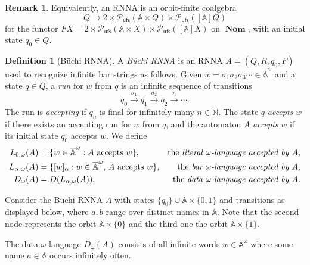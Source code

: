 \documentclass[10pt,a4paper]{amsart}
\newcommand{\midmid}{\hspace{0.2ex}{\rule[-0.1ex]{0.6pt}{1.65ex}}\hspace{0.2ex}}
\newcommand{\compr}{:}
\newcommand{\newletter}[1]{{\midmid}#1}
\newcommand{\barA}{\overline{\names}}
\numberwithin{equation}{section}
\newcommand{\xto}[1]{\xrightarrow{~#1~}}
\newcommand{\Nat}{{\mathbb{N}}}
\newcommand{\+}[1]{\mathcal{#1}\xspace}
\newcommand{\Pow}{\mathcal{P}}
\newcommand{\ufs}{{\mathsf{ufs}}}
\DeclareMathOperator{\Nom}{\mathbf{Nom}}
\newcommand{\names}{\mathbb{A}}
\theoremstyle{definition}
\newtheorem{defn}[theorem]{Definition}
\newtheorem{rem}[theorem]{Remark}
\begin{document}
%
\begin{rem}\label{rem:coalgebra}
  Equivalently, an RNNA is an orbit-finite coalgebra
  \[
    Q\longrightarrow 2\times \Pow_\ufs(\names\times Q)\times
    \Pow_\ufs([\names]Q)
  \]
  for the functor
  $FX = 2\times \Pow_\ufs(\names\times X)\times
  \Pow_\ufs([\names]X)$ on $\Nom$, %
  with an initial state $q_0\in Q$.
\end{rem}

\begin{defn}[Büchi RNNA]
 A \emph{Büchi RNNA} is an RNNA $A=(Q,R,q_0,F)$ used to recognize infinite bar strings as follows. Given
    $w=\sigma_1\sigma_2\sigma_3\cdots \in \barA^\omega$ and a state $q\in Q$, a \emph{run}
    for $w$ from $q$ is an infinite sequence of transitions
    \[
      q_0\xto{\sigma_1}q_1\xto{\sigma_2} q_2\xto{\sigma_3} \cdots.
    \]
    The run is \emph{accepting} if $q_n$ is final for infinitely many
    $n\in \Nat$. The state $q$ \emph{accepts} $w$ if there exists an accepting run for $w$ from $q$, and the automaton $A$ \emph{accepts} $w$ if its initial state $q_0$ accepts $w$. We define
    \begin{align*}
      L_{0,\omega}(A)
      & = \{w\in \barA^\omega\compr \text{$A$ accepts $w$}\}, &
      \text{the \emph{literal $\omega$-language accepted by $A$},}
      \\
      L_{\alpha,\omega}(A)
      & = \{ [w]_\alpha \compr w\in \barA^\omega, \, \text{$A$ accepts $w$}\},
      & \text{the \emph{bar $\omega$-language accepted by $A$},}
      \\
      D_\omega(A)
      & = D(L_{\alpha,\omega}(A)), 
      & \text{the \emph{data $\omega$-language accepted by $A$}}.
    \end{align*}
\end{defn}
%

\begin{example}\label{ex:rnna}
Consider the Büchi RNNA $A$ with states $\{q_0\} \cup \names\times \{0,1\}$ and transitions as displayed below, where $a,b$ range over distinct names in 
$\names$. Note that the second node represents the orbit $\names\times \{0\}$ and the third one the orbit $\names\times \{1\}$.
\begin{center}
\end{center}
 The data $\omega$-language $D_\omega(A)$ consists of all infinite words $w\in \names^\omega$ where some name $a\in \names$ occurs infinitely often.
\end{example}
\end{document}
